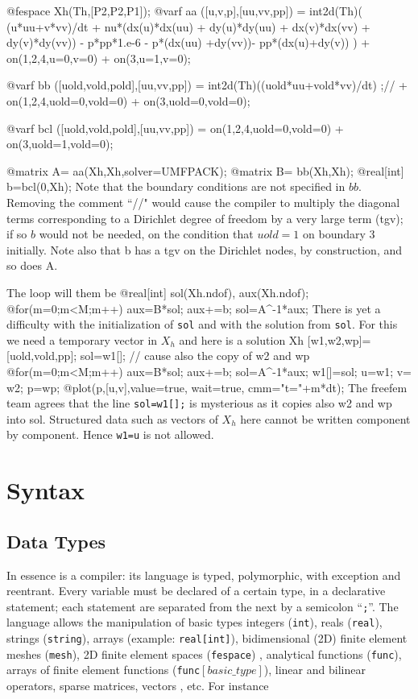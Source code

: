 \documentclass[a4paper,twoside,12pt]{book}
\begin{document}
\bFF
@fespace Xh(Th,[P2,P2,P1]);
@varf aa ([u,v,p],[uu,vv,pp])
  = int2d(Th)(  (u*uu+v*vv)/dt + nu*(dx(u)*dx(uu) + dy(u)*dy(uu)
            	 + dx(v)*dx(vv) + dy(v)*dy(vv)) 
                 - p*pp*1.e-6  - p*(dx(uu) +dy(vv))- pp*(dx(u)+dy(v))
           ) + on(1,2,4,u=0,v=0) + on(3,u=1,v=0);

@varf bb ([uold,vold,pold],[uu,vv,pp]) 
 = int2d(Th)((uold*uu+vold*vv)/dt)
;//  + on(1,2,4,uold=0,vold=0) + on(3,uold=0,vold=0);

@varf bcl ([uold,vold,pold],[uu,vv,pp]) = on(1,2,4,uold=0,vold=0) + on(3,uold=1,vold=0);

@matrix A= aa(Xh,Xh,solver=UMFPACK); 
@matrix B= bb(Xh,Xh);
@real[int] b=bcl(0,Xh); 
\eFF
Note that the boundary conditions are not specified in $bb$. Removing the comment ``//" would cause the compiler to multiply the diagonal terms corresponding to a Dirichlet degree of freedom by a very large term (tgv); if so $b$ would not be needed, on the condition that $uold=1$ on boundary 3 initially. Note also that b has a tgv on the Dirichlet nodes, by construction, and so does A.

The loop will them be 
\bFF
@real[int] sol(Xh.ndof), aux(Xh.ndof);
@for(m=0;m<M;m++){
    aux=B*sol;  aux+=b;
    sol=A^-1*aux;
}
\eFF
There is yet a difficulty with the initialization of \texttt{sol} and with the solution from \texttt{sol}.  For this we need a temporary vector in $X_h$ and here is a solution
\bFF
Xh [w1,w2,wp]=[uold,vold,pp];  
sol=w1[]; // cause also the copy of w2 and wp
@for(m=0;m<M;m++){
    aux=B*sol;  aux+=b;
    sol=A^-1*aux;
}
w1[]=sol;  u=w1; v= w2; p=wp;
@plot(p,[u,v],value=true, wait=true, cmm="t="+m*dt);
\eFF
The freefem team agrees that the line \texttt{sol=w1[];} is mysterious as it copies also w2 and wp into sol. Structured data such as vectors of $X_h$ here cannot be written component by component. Hence \texttt{w1=u} is not allowed.


\textBlack
\section{Syntax}
\subsection{Data Types}
In essence \freefempp  is a  compiler:
  its language is typed, polymorphic, with exception and reentrant.
Every variable must be declared of a certain type,  in a  declarative statement;
each statement are separated
from the next by a semicolon ``\texttt{;}''.
The language allows the manipulation of basic types
integers (\texttt{int}), reals (\texttt{real}), strings (\texttt{string}),
arrays (example: \texttt{real[int]}),
 bidimensional (2D) finite element meshes (\texttt{mesh}),
2D finite element spaces (\texttt{fespace}) , analytical functions
(\texttt{func}), arrays of
finite element functions (\texttt{func$[basic\_type]$}),
linear and bilinear operators, sparse matrices, vectors , etc. For instance
\end{document}
